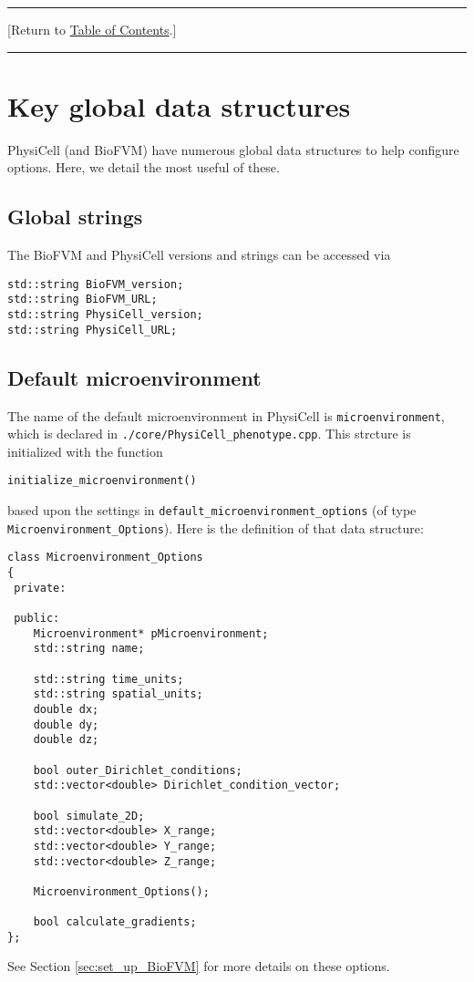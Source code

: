 \documentclass[12pt]{article}
\renewcommand{\v}{\verb}
\newcommand{\blue}[1]{\textcolor{blue}{#1}}
\newcommand{\DONE}{}%
\newcommand{\TOClink}{\begin{center}\hrule\vskip-10pt\phantom{.}\hfill[Return to \hyperlink{TOC}{Table of Contents}.]\hfill\phantom{.}\vskip3pt\hrule\end{center}}
\begin{document}
\TOClink 

\section{Key global data structures \DONE}
\label{sec:key_global_data}
PhysiCell (and BioFVM) have numerous global data structures 
to help configure options. Here, we detail the most useful 
of these. 

\subsection{Global strings}
\label{sec:global_strings}
The BioFVM and PhysiCell versions and strings can be accessed via 
\begin{verbatim}
std::string BioFVM_version; 
std::string BioFVM_URL;  
std::string PhysiCell_version; 
std::string PhysiCell_URL; 
\end{verbatim}

\subsection{Default microenvironment \DONE}
\label{sec:default_microenvironment}
The name of the default microenvironment in PhysiCell is 
\v|microenvironment|, which is declared in 
\v|./core/PhysiCell_phenotype.cpp|. This strcture is initialized 
with the function 

\v|initialize_microenvironment()|

based upon the settings in \v|default_microenvironment_options| (of type \v|Microenvironment_Options|). 
Here is the definition of that data structure: 

\begin{verbatim}
class Microenvironment_Options
{
 private:
 
 public: 
    Microenvironment* pMicroenvironment;
    std::string name; 
 
    std::string time_units; 
    std::string spatial_units; 
    double dx;
    double dy; 
    double dz; 
    
    bool outer_Dirichlet_conditions; 
    std::vector<double> Dirichlet_condition_vector; 
    
    bool simulate_2D; 
    std::vector<double> X_range; 
    std::vector<double> Y_range; 
    std::vector<double> Z_range; 
    
    Microenvironment_Options(); 
    
    bool calculate_gradients; 
};
\end{verbatim}
See Section \ref{sec:set_up_BioFVM} for more details on these options. 
\end{document}
